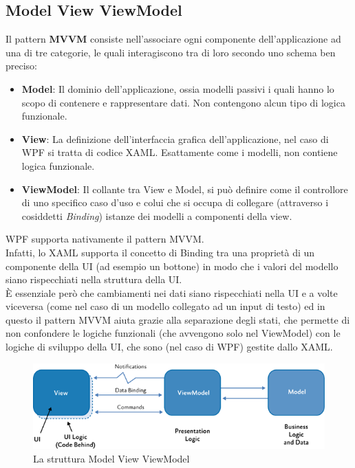 \documentclass[\main/Tesi.tex]{subfiles}
\begin{document}
\subsection{Model View ViewModel}
\label{mvvm}
Il pattern \textbf{MVVM} consiste nell'associare ogni componente dell'applicazione ad una di tre categorie, le quali interagiscono tra di loro secondo uno schema ben preciso:
\begin{itemize}
    \item \textbf{Model}: Il dominio dell'applicazione, ossia modelli passivi i quali hanno lo scopo di contenere e rappresentare dati. Non contengono alcun tipo di logica funzionale.
    \item \textbf{View}: La definizione dell'interfaccia grafica dell'applicazione, nel caso di WPF si tratta di codice XAML. Esattamente come i modelli, non contiene logica funzionale.
    \item \textbf{ViewModel}: Il collante tra View e Model, si può definire come il controllore di uno specifico caso d'uso e colui che si occupa di collegare (attraverso i cosiddetti \textit{Binding}) istanze dei modelli a componenti della view.
\end{itemize}
WPF supporta nativamente il pattern MVVM.\\
Infatti, lo XAML supporta il concetto di Binding tra una proprietà di un componente della UI (ad esempio un bottone) in modo che i valori del modello siano rispecchiati nella struttura della UI.\\
È essenziale però che cambiamenti nei dati siano rispecchiati nella UI e a volte viceversa (come nel caso di un modello collegato ad un input di testo) ed in questo il pattern MVVM aiuta grazie alla separazione degli stati, che permette di non confondere le logiche funzionali (che avvengono solo nel ViewModel) con le logiche di sviluppo della UI, che sono (nel caso di WPF) gestite dallo XAML.\\

\begin{figure}[h]
\caption{La struttura Model View ViewModel}
\includegraphics[width=\textwidth]{../images/mvvm.png}
\end{figure}
\end{document}
